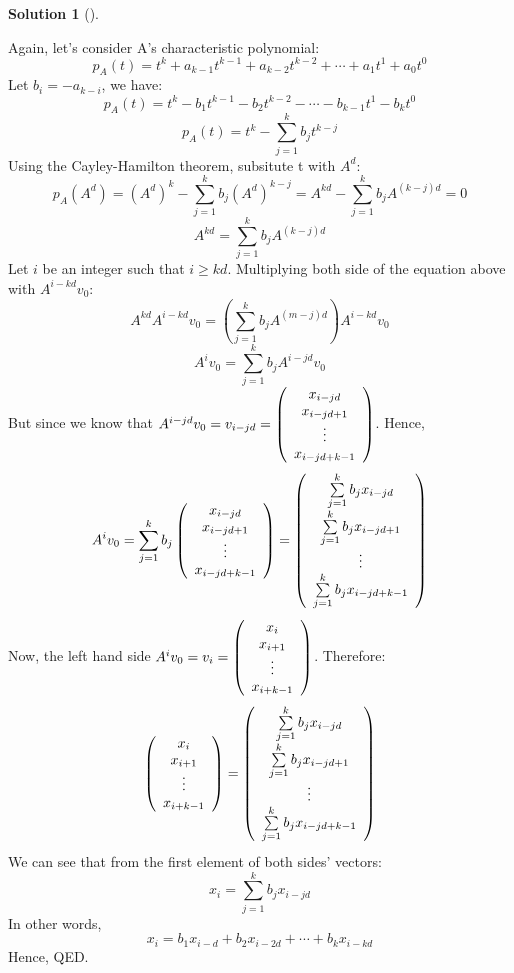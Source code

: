 \documentclass[numbers=enddot,12pt,final,onecolumn,notitlepage]{scrartcl}
\newcounter{sol}
\theoremstyle{definition}
\newtheorem{solu}[sol]{Solution}
\newenvironment{solution}[1][]
{\begin{solu}[#1]\begin{leftbar}}
        {\end{leftbar}\end{solu}}
\let\sumnonlimits\sum
\renewcommand{\sum}{\sumnonlimits\limits}
\begin{document}
\begin{solution}
	Again, let's consider A's characteristic polynomial:
	\[
		p_A(t) = t^k + a_{k-1}t^{k-1} + a_{k-2}t^{k-2} + \cdots + a_1t^{1} + a_0t^{0}
	\]
	Let $b_i = -a_{k-i}$, we have:
	\[
		p_A(t) = t^k - b_1t^{k-1} - b_2t^{k-2} - \cdots - b_{k-1}t^{1} - b_{k}t^{0}
	\]
	\[
		p_A(t) = t^k - \sum_{j=1}^{k} b_jt^{k-j}
	\]
	Using the Cayley-Hamilton theorem, subsitute t with $A^d$:
	\[
		p_A(A^d) = (A^d)^k - \sum_{j=1}^{k} b_j(A^d)^{k-j} = A^{kd} - \sum_{j=1}^{k} b_jA^{(k-j)d} = 0
	\]
	\[
		A^{kd} = \sum_{j=1}^{k} b_jA^{(k-j)d}
	\]
	Let $i$ be an integer such that $i \ge kd$. Multiplying both side of the equation above with $A^{i-kd}v_0$:
	\[
		A^{kd}A^{i-kd}v_0 = (\sum_{j=1}^{k} b_jA^{(m-j)d})A^{i-kd}v_0
	\]
	\[
		A^iv_0 = \sum_{j=1}^{k} b_jA^{i-jd}v_0
	\]
	But since we know that $A^{i-jd}v_0 = v_{i-jd} =
		\left(\begin{array}[c]{c}
				x_{i-jd}   \\
				x_{i-jd+1} \\
				\vdots     \\
				x_{i-jd+k-1}
			\end{array}\right)$. Hence,
	\[
		A^iv_0 = \sum_{j=1}^{k} b_j
		\left(\begin{array}[c]{c}
				x_{i-jd}   \\
				x_{i-jd+1} \\
				\vdots     \\
				x_{i-jd+k-1}
			\end{array}\right) =
		\left(\begin{array}[c]{c}
				\sum_{j=1}^{k} b_jx_{i-jd}   \\
				\sum_{j=1}^{k} b_jx_{i-jd+1} \\
				\vdots                       \\
				\sum_{j=1}^{k} b_jx_{i-jd+k-1}
			\end{array}\right)
	\]
	Now, the left hand side $A^iv_0 = v_i =
		\left(\begin{array}[c]{c}
				x_{i}   \\
				x_{i+1} \\
				\vdots  \\
				x_{i+k-1}
			\end{array}\right)$. Therefore:
	\[
		\left(\begin{array}[c]{c}
				x_{i}   \\
				x_{i+1} \\
				\vdots  \\
				x_{i+k-1}
			\end{array}\right) =
		\left(\begin{array}[c]{c}
				\sum_{j=1}^{k} b_jx_{i-jd}   \\
				\sum_{j=1}^{k} b_jx_{i-jd+1} \\
				\vdots                       \\
				\sum_{j=1}^{k} b_jx_{i-jd+k-1}
			\end{array}\right)
	\]
	We can see that from the first element of both sides' vectors:
	\[
		x_{i} = \sum_{j=1}^{k} b_jx_{i-jd}
	\]
	In other words,
	\[
		x_{i} = b_1x_{i-d} + b_2x_{i-2d} + \cdots + b_kx_{i-kd}
	\]
	Hence, QED.
\end{solution}
\end{document}
